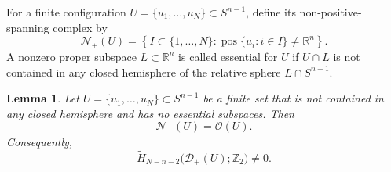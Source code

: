 \documentclass[12pt,reqno]{amsart}
\numberwithin{equation}{section}
\newtheorem{lemma}[theorem]{Lemma}
\theoremstyle{remark}
\DeclareMathOperator{\pos}{pos}
\newcommand{\R}{\mathbb R}
\newcommand{\Ncal}{\mathcal N}
\newcommand{\Dcal}{\mathcal D}
\begin{document}
For a finite configuration $U=\{u_1,\ldots,u_N\}\subset S^{n-1}$, define its non-positive-spanning complex by
\begin{equation}\label{eq:non-positive-spanning-complex}
 \Ncal_+(U)
 =\left\{I\subset\{1,\ldots,N\}:\pos\{u_i:i\in I\}\neq\R^n\right\}.
\end{equation}
A nonzero proper subspace $L\subset\R^n$ is called essential for $U$ if $U\cap L$ is not contained in any closed hemisphere of the relative sphere $L\cap S^{n-1}$.

\begin{lemma}\label{lem:no-essential-subspaces}
	Let \(U=\{u_1,\ldots,u_N\}\subset S^{n-1}\) be a finite set that is
	not contained in any closed hemisphere and has no essential subspaces.
	Then
	\begin{equation}\label{eq:open-equals-closed}
		\Ncal_+(U)=\mathcal O(U).
	\end{equation}
	Consequently,
	\begin{equation}\label{eq:zhu-deletion-homology}
		\widetilde H_{N-n-2}\bigl(\Dcal_+(U);\mathbb Z_2\bigr)\neq0.
	\end{equation}
\end{lemma}
\end{document}
